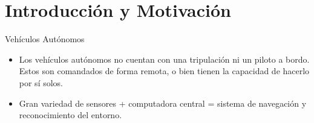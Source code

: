 \section{Introducción y Motivación}

\begin{frame}{Vehículos Autónomos}
	\begin{itemize}
		\item Los vehículos autónomos no cuentan con una tripulación ni un piloto a bordo. Estos son comandados de forma remota, o bien tienen la capacidad de hacerlo por sí solos.
		\item Gran variedad de sensores + computadora central = sistema de navegación y reconocimiento del entorno.
	\end{itemize}
	\begin{center}
	\end{center}
\end{frame}

